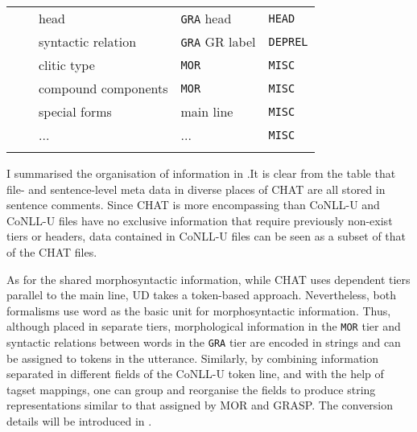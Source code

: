 \begin{table}[h!]
\begin{tabularx}{\widefigurewidth}{@{}lcXll@{}}
\multicolumn{1}{l}{\multirow{11}{*}{}}&\multicolumn{1}{c}{\multirow{3}{*}{}}& head            & \texttt{GRA} head& \texttt{HEAD}\\
\multicolumn{1}{l}{\multirow{11}{*}{}}&\multicolumn{1}{c}{\multirow{3}{*}{}}& syntactic relation  & \texttt{GRA} GR label& \texttt{DEPREL}\\\addlinespace
\multicolumn{1}{l}{\multirow{11}{*}{}}&\multicolumn{1}{c}{\multirow{4}{*}{Additional}}& clitic type      & \texttt{MOR} & \texttt{MISC}\\
\multicolumn{1}{l}{\multirow{11}{*}{}}&\multicolumn{1}{c}{\multirow{4}{*}{}}& compound components  & \texttt{MOR} & \texttt{MISC}\\
\multicolumn{1}{l}{\multirow{11}{*}{}}&\multicolumn{1}{c}{\multirow{4}{*}{}}& special forms     & main line & \texttt{MISC}\\
\multicolumn{1}{l}{\multirow{11}{*}{}}&\multicolumn{1}{c}{\multirow{4}{*}{}}& ...              & ... & \texttt{MISC}\\\addlinespace
\bottomrule
\end{tabularx}
\end{table}

I summarised the organisation of information in .It is clear from the table that file- and sentence-level meta data in diverse places of CHAT are all stored in sentence comments. Since CHAT is more encompassing than CoNLL-U and CoNLL-U files have no exclusive information that require previously non-exist tiers or headers, data contained in CoNLL-U files can be seen as a subset of that of the CHAT files.

As for the shared morphosyntactic information, while CHAT uses dependent tiers parallel to the main line, UD takes a token-based approach. Nevertheless, both formalisms use word as the basic unit for morphosyntactic information. Thus, although placed in separate tiers, morphological information in the \texttt{MOR} tier and syntactic relations between words in the \texttt{GRA} tier are encoded in strings and can be assigned to tokens in the utterance. Similarly, by combining information separated in different fields of the CoNLL-U token line, and with the help of tagset mappings, one can group and reorganise the fields to produce string representations similar to that assigned by MOR and GRASP. The conversion details will be introduced in .
